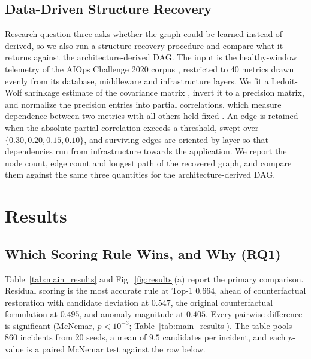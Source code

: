 \documentclass[conference]{IEEEtran}
\begin{document}
\subsection{Data-Driven Structure Recovery}
\label{sec:discovery-method}
Research question three asks whether the graph could be learned instead of derived, so we also run a structure-recovery procedure and compare what it returns against the architecture-derived DAG. The input is the healthy-window telemetry of the AIOps Challenge 2020 corpus \cite{netmanaioops2020dataset}, restricted to 40 metrics drawn evenly from its database, middleware and infrastructure layers. We fit a Ledoit-Wolf shrinkage estimate of the covariance matrix \cite{ledoit2004well}, invert it to a precision matrix, and normalize the precision entries into partial correlations, which measure dependence between two metrics with all others held fixed \cite{hojsgaard2012graphical}. An edge is retained when the absolute partial correlation exceeds a threshold, swept over $\{0.30, 0.20, 0.15, 0.10\}$, and surviving edges are oriented by layer so that dependencies run from infrastructure towards the application. We report the node count, edge count and longest path of the recovered graph, and compare them against the same three quantities for the architecture-derived DAG.

\section{Results}
\label{sec:results}

\subsection{Which Scoring Rule Wins, and Why (RQ1)}
\label{sec:results-main}
Table~\ref{tab:main_results} and Fig.~\ref{fig:results}(a) report the primary comparison. Residual scoring is the most accurate rule at Top-1 $0.664$, ahead of counterfactual restoration with candidate deviation at $0.547$, the original counterfactual formulation at $0.495$, and anomaly magnitude at $0.405$. Every pairwise difference is significant (McNemar, $p<10^{-3}$; Table~\ref{tab:main_results}). The table pools 860 incidents from 20 seeds, a mean of $9.5$ candidates per incident, and each $p$-value is a paired McNemar test against the row below.
\end{document}
